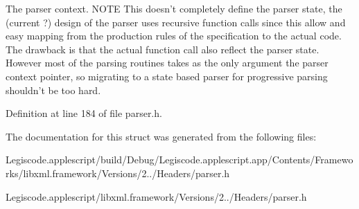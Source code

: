 The parser context. N\-O\-T\-E This doesn't completely define the parser state, the (current ?) design of the parser uses recursive function calls since this allow and easy mapping from the production rules of the specification to the actual code. The drawback is that the actual function call also reflect the parser state. However most of the parsing routines takes as the only argument the parser context pointer, so migrating to a state based parser for progressive parsing shouldn't be too hard. 

Definition at line 184 of file parser.\-h.



The documentation for this struct was generated from the following files\-:\begin{DoxyCompactItemize}
\item 
Legiscode.\-applescript/build/\-Debug/\-Legiscode.\-applescript.\-app/\-Contents/\-Frameworks/libxml.\-framework/\-Versions/2../\-Headers/parser.\-h\item 
Legiscode.\-applescript/libxml.\-framework/\-Versions/2../\-Headers/parser.\-h\end{DoxyCompactItemize}
